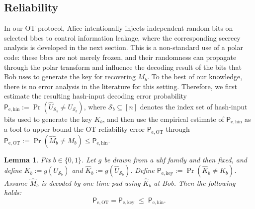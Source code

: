 \documentclass[onecolumn]{IEEEtran} %
\newcommand{\1}{\mathbbm{1}}
\theoremstyle{boldremark}
\newtheorem{lemma}{Lemma}
\begin{document}
\subsection{Reliability}\label{sec:reliability}
In our OT protocol, Alice intentionally injects independent random bits on
selected \gls{bbcs} to control information leakage, where the corresponding secrecy
analysis is developed in the next section. This is a non-standard use of a polar
code: these \gls{bbcs} are not merely frozen, and their
randomness can propagate through the polar transform and influence the decoding
result of the bits that Bob uses to generate the key for recovering \(M_b\). To the best of our knowledge, there is no error analysis in
the literature for this setting. Therefore, we first estimate the resulting
hash-input decoding error probability
\(\textsf{P}_{\mathrm{e,hin}}:=\Pr(\widehat U_{\mathcal{S}_b}\neq U_{\mathcal{S}_b})\), where \(\mathcal{S}_b\subseteq[n]\) denotes the index set of hash-input bits
used to generate the key \(K_b\), and then use the empirical estimate of $\textsf{P}_{\mathrm{e,hin}}$ as a tool to upper bound the OT reliability error \(\textsf{P}_{\mathrm{e,OT}}\) through
\(\textsf{P}_{\mathrm{e,OT}}:=\Pr(\widehat M_b\neq M_b)\le \textsf{P}_{\mathrm{e,hin}}\).





\begin{lemma}\label{lem:rel-bridge}
Fix \(b\in\{0,1\}\). Let \(g\) be drawn from a \gls{uhf} family and then fixed, and define
\(K_b:=g(U_{\mathcal{S}_b})\) and \(\widehat K_b:=g(\widehat U_{\mathcal{S}_b})\).
Define \(\textsf{P}_{\mathrm{e,key}}:=\Pr(\widehat K_b\neq K_b)\).
Assume \(\widehat M_b\) is decoded by one-time-pad using \(\widehat K_b\) at Bob. Then the following holds:
\begin{equation}
  \textsf{P}_{\mathrm{e,OT}}=\textsf{P}_{\mathrm{e,key}}
  \;\le\;
  \textsf{P}_{\mathrm{e,hin}}.
\end{equation}
\end{lemma}
\end{document}
